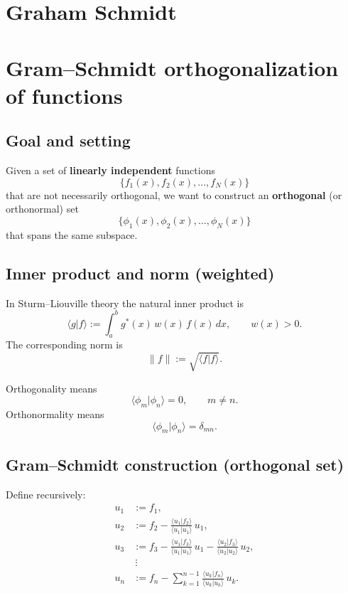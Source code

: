 \section{Graham Schmidt}

\section{Gram--Schmidt orthogonalization of functions}

\subsection{Goal and setting}
Given a set of \textbf{linearly independent} functions
\[
\{f_1(x), f_2(x), \dots, f_N(x)\}
\]
that are not necessarily orthogonal, we want to construct an \textbf{orthogonal}
(or orthonormal) set
\[
\{\phi_1(x), \phi_2(x), \dots, \phi_N(x)\}
\]
that spans the same subspace.

\subsection{Inner product and norm (weighted)}
In Sturm--Liouville theory the natural inner product is
\begin{equation}
\langle g|f\rangle := \int_a^b g^*(x)\,w(x)\,f(x)\,dx,
\qquad w(x)>0.
\end{equation}
The corresponding norm is
\begin{equation}
\|f\| := \sqrt{\langle f|f\rangle}.
\end{equation}

Orthogonality means
\begin{equation}
\langle \phi_m|\phi_n\rangle = 0,\qquad m\neq n.
\end{equation}
Orthonormality means
\begin{equation}
\langle \phi_m|\phi_n\rangle = \delta_{mn}.
\end{equation}


\subsection{Gram--Schmidt construction (orthogonal set)}
Define recursively:
\begin{align}
u_1 &:= f_1,\\[4pt]
u_2 &:= f_2 - \frac{\langle u_1|f_2\rangle}{\langle u_1|u_1\rangle}\,u_1,\\[6pt]
u_3 &:= f_3
- \frac{\langle u_1|f_3\rangle}{\langle u_1|u_1\rangle}\,u_1
- \frac{\langle u_2|f_3\rangle}{\langle u_2|u_2\rangle}\,u_2,\\[6pt]
&\ \vdots\\[4pt]
u_n &:= f_n - \sum_{k=1}^{n-1}
\frac{\langle u_k|f_n\rangle}{\langle u_k|u_k\rangle}\,u_k.
\end{align}

